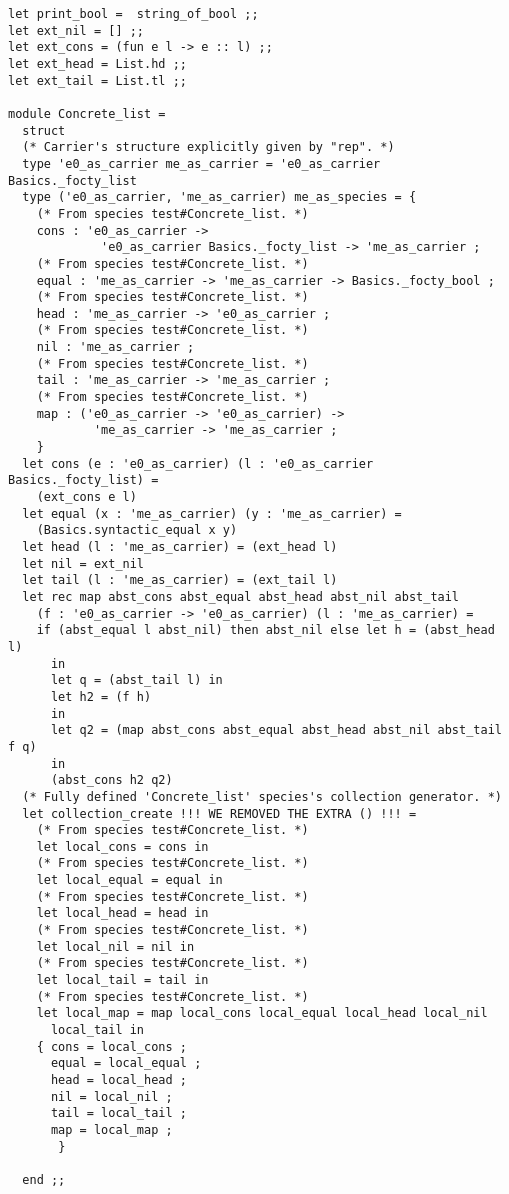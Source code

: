 {\footnotesize
\begin{lstlisting}[language=MyOCaml,
                   emph={WE, REMOVED, THE, EXTRA, ()}, emphstyle=\color{red}]
let print_bool =  string_of_bool ;;
let ext_nil = [] ;;
let ext_cons = (fun e l -> e :: l) ;;
let ext_head = List.hd ;;
let ext_tail = List.tl ;;

module Concrete_list =
  struct
  (* Carrier's structure explicitly given by "rep". *)
  type 'e0_as_carrier me_as_carrier = 'e0_as_carrier Basics._focty_list
  type ('e0_as_carrier, 'me_as_carrier) me_as_species = {
    (* From species test#Concrete_list. *)
    cons : 'e0_as_carrier ->
             'e0_as_carrier Basics._focty_list -> 'me_as_carrier ;
    (* From species test#Concrete_list. *)
    equal : 'me_as_carrier -> 'me_as_carrier -> Basics._focty_bool ;
    (* From species test#Concrete_list. *)
    head : 'me_as_carrier -> 'e0_as_carrier ;
    (* From species test#Concrete_list. *)
    nil : 'me_as_carrier ;
    (* From species test#Concrete_list. *)
    tail : 'me_as_carrier -> 'me_as_carrier ;
    (* From species test#Concrete_list. *)
    map : ('e0_as_carrier -> 'e0_as_carrier) ->
            'me_as_carrier -> 'me_as_carrier ;
    }
  let cons (e : 'e0_as_carrier) (l : 'e0_as_carrier Basics._focty_list) =
    (ext_cons e l)
  let equal (x : 'me_as_carrier) (y : 'me_as_carrier) =
    (Basics.syntactic_equal x y)
  let head (l : 'me_as_carrier) = (ext_head l)
  let nil = ext_nil
  let tail (l : 'me_as_carrier) = (ext_tail l)
  let rec map abst_cons abst_equal abst_head abst_nil abst_tail
    (f : 'e0_as_carrier -> 'e0_as_carrier) (l : 'me_as_carrier) =
    if (abst_equal l abst_nil) then abst_nil else let h = (abst_head l)
      in
      let q = (abst_tail l) in
      let h2 = (f h)
      in
      let q2 = (map abst_cons abst_equal abst_head abst_nil abst_tail f q)
      in
      (abst_cons h2 q2)
  (* Fully defined 'Concrete_list' species's collection generator. *)
  let collection_create !!! WE REMOVED THE EXTRA () !!! =
    (* From species test#Concrete_list. *)
    let local_cons = cons in
    (* From species test#Concrete_list. *)
    let local_equal = equal in
    (* From species test#Concrete_list. *)
    let local_head = head in
    (* From species test#Concrete_list. *)
    let local_nil = nil in
    (* From species test#Concrete_list. *)
    let local_tail = tail in
    (* From species test#Concrete_list. *)
    let local_map = map local_cons local_equal local_head local_nil
      local_tail in
    { cons = local_cons ;
      equal = local_equal ;
      head = local_head ;
      nil = local_nil ;
      tail = local_tail ;
      map = local_map ;
       }
    
  end ;;
\end{lstlisting}
}
